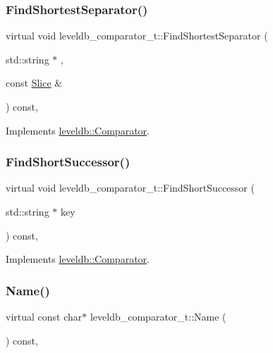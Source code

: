 \subsubsection{\texorpdfstring{FindShortestSeparator()}{FindShortestSeparator()}}
{\footnotesize\ttfamily virtual void leveldb\+\_\+comparator\+\_\+t\+::\+Find\+Shortest\+Separator (\begin{DoxyParamCaption}\item[{std\+::string $\ast$}]{,  }\item[{const \mbox{\hyperlink{classleveldb_1_1_slice}{Slice}} \&}]{ }\end{DoxyParamCaption}) const\hspace{0.3cm}{\ttfamily [inline]}, {\ttfamily [virtual]}}



Implements \mbox{\hyperlink{structleveldb_1_1_comparator_abdfe6076225e95b91ffd94f646063115}{leveldb\+::\+Comparator}}.

\mbox{\label{structleveldb__comparator__t_a46671a92506b28d1df61125499df3d23}} 
\subsubsection{\texorpdfstring{FindShortSuccessor()}{FindShortSuccessor()}}
{\footnotesize\ttfamily virtual void leveldb\+\_\+comparator\+\_\+t\+::\+Find\+Short\+Successor (\begin{DoxyParamCaption}\item[{std\+::string $\ast$}]{key }\end{DoxyParamCaption}) const\hspace{0.3cm}{\ttfamily [inline]}, {\ttfamily [virtual]}}



Implements \mbox{\hyperlink{structleveldb_1_1_comparator_a49751dd906595633161dfad943d24b3b}{leveldb\+::\+Comparator}}.

\mbox{\label{structleveldb__comparator__t_aaf7e79d77687d0542037ae5310296180}} 
\subsubsection{\texorpdfstring{Name()}{Name()}}
{\footnotesize\ttfamily virtual const char$\ast$ leveldb\+\_\+comparator\+\_\+t\+::\+Name (\begin{DoxyParamCaption}{ }\end{DoxyParamCaption}) const\hspace{0.3cm}{\ttfamily [inline]}, {\ttfamily [virtual]}}



